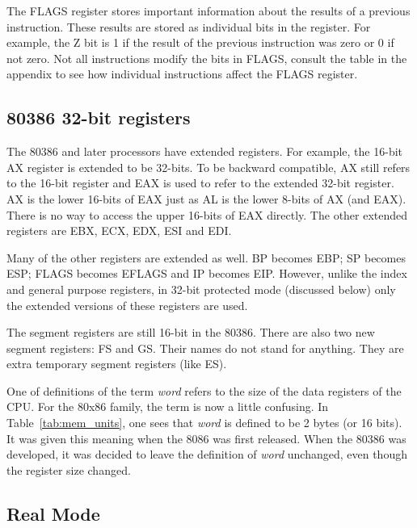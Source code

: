 The FLAGS  register stores important information
about the results of a previous instruction. These results are stored
as individual bits in the register. For example, the Z bit is 1 if the
result of the previous instruction was zero or 0 if not zero. Not all
instructions modify the bits in FLAGS, consult the table in the
appendix to see how individual instructions affect the FLAGS register.

\subsection{80386 32-bit registers}

The 80386 and later processors have extended registers. For example, the
16-bit AX register is extended to be 32-bits. To be backward compatible, AX
still refers to the 16-bit register and EAX is used to refer to the extended
32-bit register. AX is the lower 16-bits of EAX just as AL is the lower 8-bits
of AX (and EAX). There is no way to access the upper 16-bits of EAX directly.
The other extended registers are EBX, ECX, EDX, ESI and EDI.

Many of the other registers are extended as well. BP becomes
EBP; SP becomes ESP; FLAGS becomes EFLAGS and IP becomes
EIP. However, unlike the index and general purpose
registers, in 32-bit protected mode (discussed below) only the
extended versions of these registers are used.

The segment registers are still 16-bit in the 80386. There are also
two new segment registers: FS and GS. Their
names do not stand for anything. They are extra temporary segment
registers (like ES).

One of definitions of the term \emph{word}  refers to the
size of the data registers of the CPU. For the 80x86 family, the term
is now a little confusing. In Table~\ref{tab:mem_units}, one sees that
\emph{word} is defined to be 2 bytes (or 16 bits). It was given this
meaning when the 8086 was first released. When the 80386 was
developed, it was decided to leave the definition of \emph{word}
unchanged, even though the register size changed.

\subsection{Real Mode \label{real_mode} }

